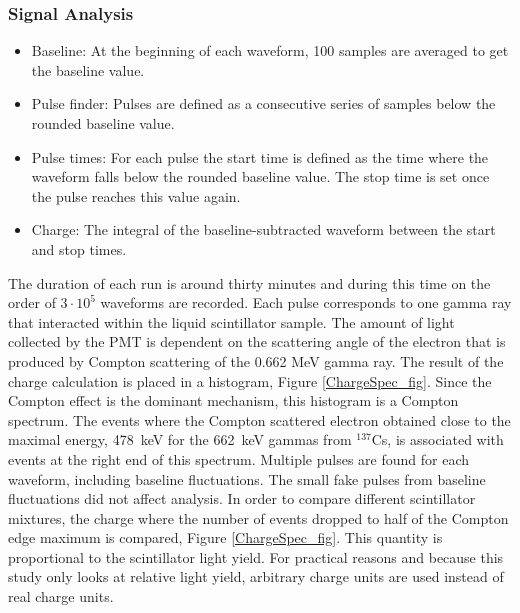\documentclass{JINST}
\begin{document}
\subsubsection{Signal Analysis}
\begin{itemize}
\item Baseline: At the beginning of each waveform, 100 samples are averaged to get the baseline value. 
\item Pulse finder: Pulses are defined as a consecutive series of samples below the rounded baseline value.
\item Pulse times: For each pulse the start time is defined as the time where the waveform falls below the rounded baseline value. The stop time is set once the pulse reaches this value again.  
\item Charge: The integral of the baseline-subtracted waveform between the start and stop times.  
\end{itemize}

The duration of each run is around thirty minutes and during this time on the order of $3\cdot10^5$ waveforms are recorded. Each pulse corresponds to one gamma ray that interacted within the liquid scintillator sample. The amount of light collected by the PMT is dependent on the scattering angle of the electron that is produced by Compton scattering of the 0.662 MeV gamma ray. The result of the charge calculation is placed in a histogram, Figure \ref{ChargeSpec_fig}. Since the Compton effect is the dominant mechanism, this histogram is a Compton spectrum. The events where the Compton scattered electron obtained close to the maximal energy, 478~keV for the 662~keV gammas from $^{137}$Cs, is associated with events at the right end of this spectrum. %
Multiple pulses are found for each waveform, including baseline fluctuations. The small fake pulses from baseline fluctuations did not affect analysis. In order to compare different scintillator mixtures, the charge where the number of events dropped to half of the Compton edge maximum is compared, Figure \ref{ChargeSpec_fig}. This quantity is proportional to the scintillator light yield. For practical reasons and because this study only looks at relative light yield, arbitrary charge units are used instead of real charge units.
\end{document}
